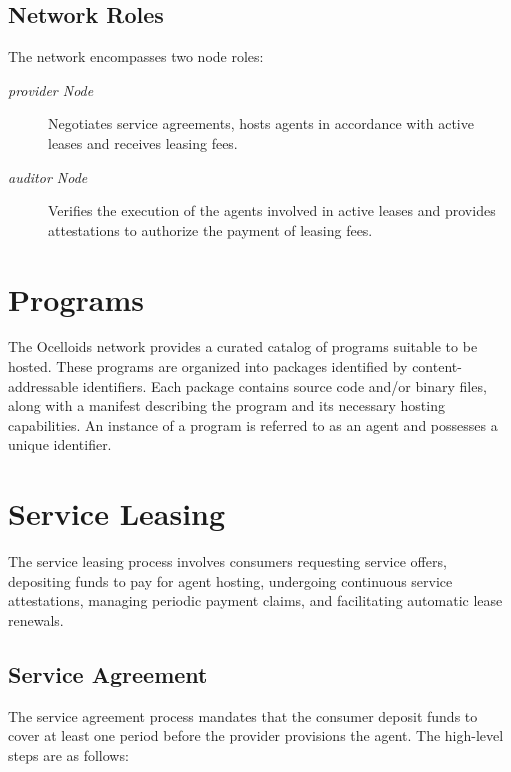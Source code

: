 \documentclass{oc}
\begin{document}
\subsection{Network Roles}\label{sec:network-roles}

The network encompasses two node roles:
\begin{description}
  \item[\emph{\Gls*{provider} Node}] Negotiates service agreements, hosts \glspl{agent} in accordance with active leases and receives leasing fees.
  \item[\emph{\Gls*{auditor} Node}] Verifies the execution of the \glspl{agent} involved in active leases and provides attestations to authorize the payment of leasing fees.
\end{description}

\section{Programs}\label{sec:programs}

The Ocelloids network provides a curated catalog of programs suitable to be hosted.
These \glspl{program} are organized into packages identified by content-addressable identifiers.
Each package contains source code and/or binary files, along with a manifest describing the program and its necessary hosting capabilities.
An instance of a program is referred to as an \gls{agent} and possesses a unique identifier.


\section{Service Leasing}\label{sec:leasing}

The service leasing process involves consumers requesting service offers, depositing funds to pay for \gls{agent} hosting, undergoing continuous service attestations, managing periodic payment claims, and facilitating automatic lease renewals.

\subsection{Service Agreement}\label{sec:service-agreement}

The service agreement process mandates that the \gls{consumer} deposit funds to cover at least one period before the \gls{provider} provisions the \gls{agent}.
The high-level steps are as follows:
\end{document}
